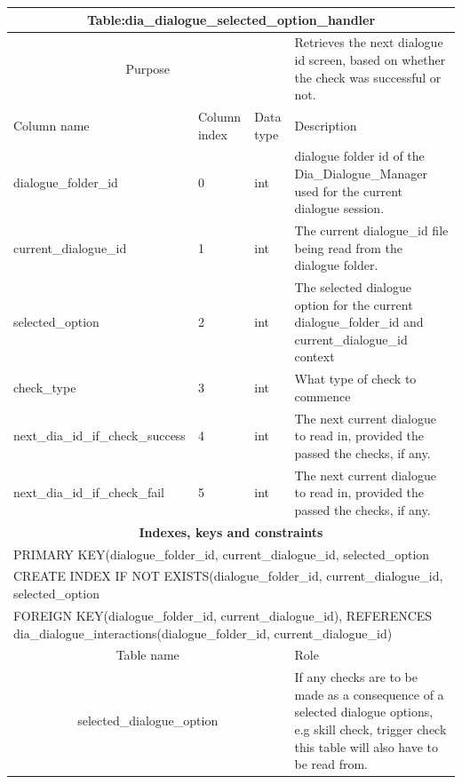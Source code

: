\documentclass{report}
\begin{document}
\begin{table}[h]
\begin{tabular}{ |p{6cm}|p{1.2cm}|p{3cm}|p{3.6cm}|  }
\hline
 \multicolumn{4}{|c|}{\textbf{Table:dia\_dialogue\_selected\_option\_handler}} \\
 \hline
  \multicolumn{3}{|c|}{Purpose} & {Retrieves the next dialogue id screen, based on whether the check was successful or not.} \\
 \hline
 Column name & Column index & Data type & Description \\
  \hline
 dialogue\_folder\_id & 0 & int & dialogue folder id of the Dia\_Dialogue\_Manager used for the current dialogue session.\\
 current\_dialogue\_id & 1 & int & The current dialogue\_id file being read from the dialogue folder.\\
 selected\_option & 2 & int & The selected dialogue option for the current dialogue\_folder\_id and current\_dialogue\_id context \\
check\_type & 3 & int & What type of check to commence \\
 next\_dia\_id\_if\_check\_success & 4 & int & The next current dialogue to read in, provided the passed the checks, if any. \\
 next\_dia\_id\_if\_check\_fail & 5 & int & The next current dialogue to read in, provided the passed the checks, if any. \\
\hline 
\multicolumn{4}{|c|}{\textbf{Indexes, keys and constraints}}  \\
\hline
   \multicolumn{4}{|p{5cm}|}{PRIMARY KEY(dialogue{\_}folder{\_}id, current{\_}dialogue{\_}id, selected\_option} \\
      \multicolumn{4}{|p{5cm}|}{CREATE INDEX IF NOT EXISTS(dialogue{\_}folder{\_}id, current{\_}dialogue{\_}id, selected{\_option}} \\ 
   \hline
   \multicolumn{4}{|p{5cm}|}{FOREIGN KEY(dialogue{\_}folder{\_}id, current{\_}dialogue{\_}id), REFERENCES dia\_dialogue\_interactions(dialogue{\_}folder{\_}id, current{\_}dialogue{\_}id)} \\      
 \hline
\multicolumn{3}{|c|}{Table name} & Role \\
\hline
\multicolumn{3}{|c|}{selected\_dialogue\_option} & If any checks are to be made as a consequence of a selected dialogue options, e.g skill check, trigger check this table will also have to be read from. \\
\hline
\end{tabular}
\end{table}
\end{document}
